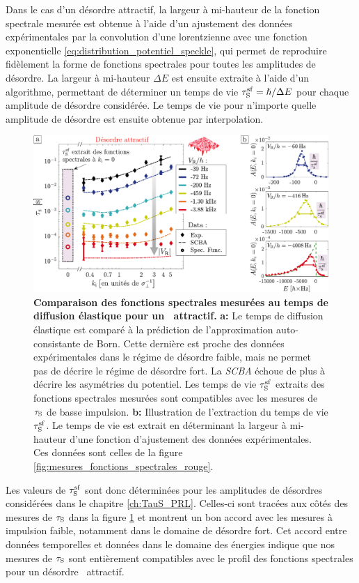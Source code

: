 Dans le cas d'un désordre attractif, la largeur à mi-hauteur de la fonction spectrale mesurée est obtenue à l'aide d'un ajustement des données expérimentales par la convolution d'une lorentzienne avec une fonction exponentielle \ref{eq:distribution_potentiel_speckle}, qui permet de reproduire fidèlement  la forme de fonctions spectrales pour toutes les amplitudes de désordre. La largeur à mi-hauteur $\Delta E$ est ensuite extraite à l'aide d'un algorithme, permettant de déterminer un temps de vie $\tau_{\mathrm{S}}^{\mathrm{sf}}=\hslash/\Delta E$ pour chaque amplitude de désordre considérée. Le temps de vie pour n'importe quelle amplitude de désordre est ensuite obtenue par interpolation.

\begin{figure}
\centering
\includegraphics[width=\textwidth]{Fig/TauS_NJP/comparaison_specfunc_taus_rouge.pdf}
\caption{\textbf{Comparaison des fonctions spectrales mesurées au temps de diffusion élastique pour un \speckle\ attractif.} \textbf{a:} Le temps de diffusion élastique est comparé à la prédiction de l'approximation auto-consistante de Born. Cette dernière est proche des données expérimentales dans le régime de désordre faible, mais ne permet pas de décrire le régime de désordre fort. La \textit{SCBA} échoue de plus à décrire les asymétries du potentiel. Les temps de vie $\tau_{\mathrm{S}}^{\mathrm{sf}}$ extraits des fonctions spectrales mesurées sont compatibles avec les mesures de $\tau_{\mathrm{S}}$ de basse impulsion. \textbf{b:} Illustration de l'extraction du temps de vie $\tau_{\mathrm{S}}^{\mathrm{sf}}$. Le temps de vie est extrait en déterminant la largeur à mi-hauteur d'une fonction d'ajustement des données expérimentales. Ces données sont celles de la figure \ref{fig:mesures_fonctions_spectrales_rouge}.}
\label{fig:comparaison_taus_specfunc_rouge}
\end{figure}

Les valeurs de $\tau_{\mathrm{S}}^{\mathrm{sf}}$ sont donc déterminées pour les amplitudes de désordres considérées  dans le chapitre \ref{ch:TauS_PRL}. Celles-ci sont tracées aux côtés des mesures de $\tau_{\mathrm{S}}$ dans la figure \ref{fig:comparaison_taus_specfunc_rouge} et montrent un bon accord avec les mesures à impulsion faible, notamment dans le domaine de désordre fort. Cet accord entre données temporelles et données dans le domaine des énergies indique que nos mesures de $\tau_{\mathrm{S}}$ sont entièrement compatibles avec le profil des fonctions spectrales pour un désordre \speckle\ attractif.





